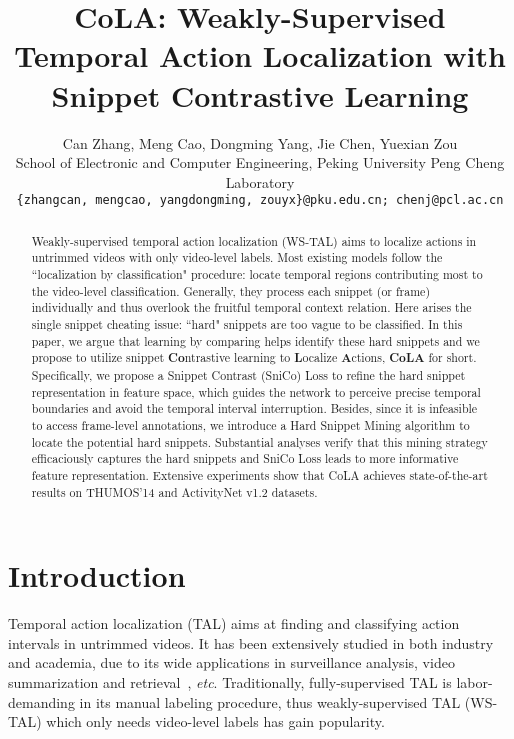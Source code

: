 \documentclass[final]{cvpr}
\begin{document}
\title{CoLA: Weakly-Supervised Temporal Action Localization with \\Snippet Contrastive Learning}

\author{Can Zhang, Meng Cao, Dongming Yang, Jie Chen, Yuexian Zou\\
School of Electronic and Computer Engineering, Peking University Peng Cheng Laboratory\\
{\tt\small \{zhangcan, mengcao, yangdongming, zouyx\}@pku.edu.cn; chenj@pcl.ac.cn}
}

\maketitle
\pagestyle{empty}
\thispagestyle{empty}

\begin{abstract}
Weakly-supervised temporal action localization (WS-TAL) aims to localize actions in untrimmed videos with only video-level labels. Most existing models follow the ``localization by classification" procedure: locate temporal regions contributing most to the video-level classification. Generally, they process each snippet (or frame) individually and thus overlook the fruitful temporal context relation. Here arises the single snippet cheating issue: ``hard" snippets are too vague to be classified. In this paper, we argue that learning by comparing helps identify these hard snippets and we propose to utilize snippet \textbf{Co}ntrastive learning to \textbf{L}ocalize \textbf{A}ctions, \textbf{CoLA} for short. Specifically, we propose a Snippet Contrast (SniCo) Loss to refine the hard snippet representation in feature space, which guides the network to perceive precise temporal boundaries and avoid the temporal interval interruption. Besides, since it is infeasible to access frame-level annotations, we introduce a Hard Snippet Mining algorithm to locate the potential hard snippets. Substantial analyses verify that this mining strategy efficaciously captures the hard snippets and SniCo Loss leads to more informative feature representation. Extensive experiments show that CoLA achieves state-of-the-art results on THUMOS'14 and ActivityNet v1.2 datasets. 
\end{abstract} 
\section{Introduction} \label{sec:intro}

Temporal action localization (TAL) aims at finding and classifying action intervals in untrimmed videos. It has been extensively studied in both industry and academia, due to its wide applications in surveillance analysis, video summarization and retrieval~\cite{vishwakarma2013survey,lee2012discovering,ma2005generic}, \emph{etc}. Traditionally, fully-supervised TAL is labor-demanding in its manual labeling procedure, thus weakly-supervised TAL (WS-TAL) which only needs video-level labels has gain popularity. 
\end{document}

